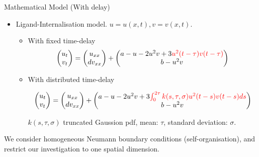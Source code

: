 \documentclass{beamer}
\begin{document}
\begin{frame}{Mathematical Model (With delay)}
    \begin{itemize}
        \item Ligand-Internalisation model. $u=u(x,t), v=v(x,t)$.
        \begin{itemize}

        \item With fixed time-delay
        \begin{equation}
            \begin{pmatrix}
                u_t\\
                v_t
            \end{pmatrix}
            =
            \begin{pmatrix}
                u_{xx}\\
                dv_{xx}
            \end{pmatrix}
            +
            \begin{pmatrix}
                a-u-2u^2v+3\textcolor{red}{u^2(t-\tau)v(t-\tau)}\\
                b-u^2v
            \end{pmatrix}
        \end{equation}


        \item With distributed time-delay

        \begin{equation}
            \begin{pmatrix}
                u_t\\
                v_t
            \end{pmatrix}
            =
            \begin{pmatrix}
                u_{xx}\\
                dv_{xx}
            \end{pmatrix}
            +
            \begin{pmatrix}
                a-u-2u^2v+3\textcolor{red}{\int_0^{2\tau}k(s,\tau,\sigma)u^2(t-s)v(t-s) ds}\\
                b-u^2v
            \end{pmatrix}
        \end{equation}

        $k(s,\tau,\sigma)$ truncated Gaussion pdf, mean: $\tau$, standard deviation: $\sigma$.

    \end{itemize}
\end{itemize}
We consider homogeneous Neumann boundary conditions (self-organisation), and restrict our investigation to one spatial dimension.
\end{frame}
\end{document}
